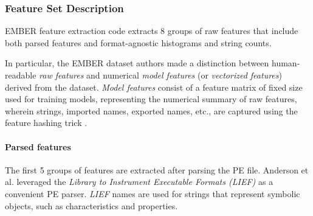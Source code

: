 \documentclass[pdfa%
,cucitura%
]{toptesi}
\begin{document}
\subsubsection{Feature Set Description}
EMBER feature extraction code extracts 8 groups of raw features that include both parsed features and format-agnostic histograms and string counts.

In particular, the EMBER dataset authors \cite{AndersonEMBER} made a distinction between human-readable \textit{raw features} and numerical \textit{model features} (or \textit{vectorized features}) derived from the dataset. \textit{Model features} consist of a feature matrix of fixed size used for training models, representing the numerical summary of raw features, wherein strings, imported names, exported names, etc., are captured using the feature hashing trick \cite{weinbergerFHLSML}.

\paragraph{Parsed features}
The first 5 groups of features are extracted after parsing the PE file. Anderson et al. \cite{AndersonEMBER} leveraged the \textit{Library to Instrument Executable Formats (LIEF)} \cite{LIEFProject} as a convenient PE parser. \textit{LIEF} names are used for strings that represent symbolic objects, such as characteristics and properties.
\end{document}

